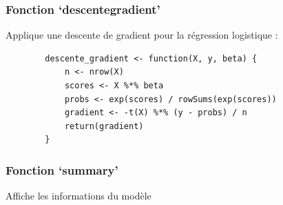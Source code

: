 \documentclass[10pt,french]{report}
\begin{document}
	\subsubsection{Fonction \enquote*{descente\textunderscore gradient}}

	Applique une descente de gradient pour la régression logistique :
	\begin{verbatim}
		descente_gradient <- function(X, y, beta) {
			n <- nrow(X)
			scores <- X %*% beta
			probs <- exp(scores) / rowSums(exp(scores))
			gradient <- -t(X) %*% (y - probs) / n
			return(gradient)
		}
	\end{verbatim}

    \subsubsection{Fonction \enquote*{summary}}
    Affiche les informations du modèle 
\end{document}
